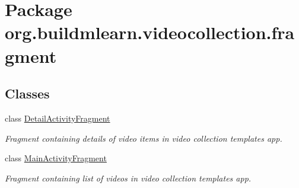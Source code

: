 \hypertarget{namespaceorg_1_1buildmlearn_1_1videocollection_1_1fragment}{}\section{Package org.\+buildmlearn.\+videocollection.\+fragment}
\label{namespaceorg_1_1buildmlearn_1_1videocollection_1_1fragment}
\subsection*{Classes}
\begin{DoxyCompactItemize}
\item 
class \hyperlink{classorg_1_1buildmlearn_1_1videocollection_1_1fragment_1_1DetailActivityFragment}{Detail\+Activity\+Fragment}
\begin{DoxyCompactList}\small\item\em Fragment containing details of video items in video collection template\textquotesingle{}s app. \end{DoxyCompactList}\item 
class \hyperlink{classorg_1_1buildmlearn_1_1videocollection_1_1fragment_1_1MainActivityFragment}{Main\+Activity\+Fragment}
\begin{DoxyCompactList}\small\item\em Fragment containing list of videos in video collection template\textquotesingle{}s app. \end{DoxyCompactList}\end{DoxyCompactItemize}
